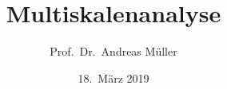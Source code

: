 %
%
%
\usepackage[utf8]{inputenc}
\usepackage[T1]{fontenc}
\usepackage{epic}
\usepackage{color}
\usepackage{array}
\usepackage{ifthen}
\usepackage{amsmath}
\usepackage{lmodern}
\usepackage{tikz}
\usetikzlibrary{shapes.geometric}
\beamertemplatenavigationsymbolsempty
\title[MSA]{Multiskalenanalyse}
\author[A.~Müller]{Prof.~Dr.~Andreas Müller}
\date[]{18.~März 2019}

\theoremstyle{definition}
\newtheorem{beispiel}{Beispiel}
\newtheorem{folgerungen}{Folgerungen}
\newtheorem{frage}{Frage}
\newtheorem{raumW}{Orthogonalkomplement $W_j$}
\newtheorem{osumme}{Orthogonale Summe}

\newenvironment{linsys}[1]{%
\begin{tabular}{*{#1}{\linsysR@{\;}\linsysC}@{\;}\linsysR}}%
{\end{tabular}}

